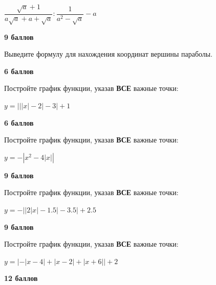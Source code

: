 $\dfrac{\sqrt{a}+1}{a \sqrt{a}+a+\sqrt{a}}: \dfrac{1}{a^2-\sqrt{a}}-a$

\begin{flushright} \textbf{9 баллов}\\ 
\end{flushright}

\hspace{3mm}

\hspace{1mm}

 Выведите формулу для нахождения координат вершины параболы.

\begin{flushright} \textbf{6 баллов}\\ 
\end{flushright}

 Постройте график функции, указав \textbf{ВСЕ} важные точки:

$y=\left|\left|\left|x\right|-2\right|-3\right|+1$

\begin{flushright} \textbf{6 баллов}\\ 
\end{flushright}

 Постройте график функции, указав \textbf{ВСЕ} важные точки:

$y=-\left|x^{2}-4\left|x\right|\right|$

\begin{flushright} \textbf{9 баллов}\\ 
\end{flushright}

 Постройте график функции, указав \textbf{ВСЕ} важные точки:

$y=-\left|\left|2\left|x\right|-1.5\right|-3.5\right|+2.5$

\begin{flushright} \textbf{9 баллов}\\ 
\end{flushright}


 Постройте график функции, указав \textbf{ВСЕ} важные точки:

$y=\left|-\left|x-4\right|+\left|x-2\right|+\left|x+6\right|\right|+2$

\begin{flushright} \textbf{12 баллов}\\ 
\end{flushright}

